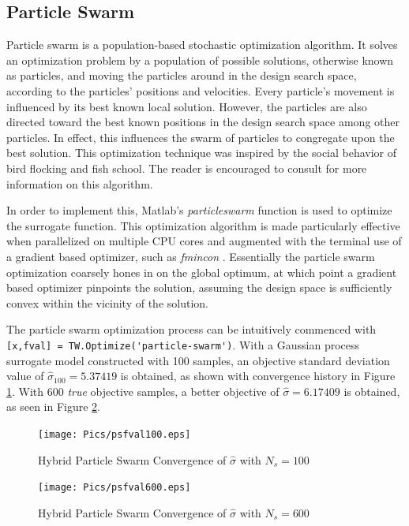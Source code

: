 \documentclass{article}
\begin{document}
\subsection{Particle Swarm} \label{ps}
Particle swarm is a population-based stochastic optimization algorithm. It solves an optimization problem by a population of possible solutions, otherwise known as particles, and moving the particles around in the design search space, according to the particles' positions and velocities. Every particle's movement is influenced by its best known local solution. However, the particles are also directed toward the best known positions in the design search space among other particles. In effect, this influences the swarm of particles to congregate upon the best solution. This optimization technique was inspired by the social behavior of bird flocking and fish school. The reader is encouraged to consult \cite{Kennedy1995} for more information on this algorithm. 

In order to implement this, Matlab's \textit{particleswarm} \cite{Matlab} function is used to optimize the surrogate function. This optimization algorithm is made particularly effective when parallelized on multiple CPU cores and augmented with the terminal use of a gradient based optimizer, such as \textit{fmincon} \cite{Matlab}. Essentially the particle swarm optimization coarsely hones in on the global optimum, at which point a gradient based optimizer pinpoints the solution, assuming the design space is sufficiently convex within the vicinity of the solution. 

The particle swarm optimization process can be intuitively commenced with \lstinline{[x,fval] = TW.Optimize('particle-swarm')}. With a Gaussian process surrogate model constructed with 100 samples, an objective standard deviation value of $\hat{\sigma}_{100} = 5.37419$ is obtained, as shown with convergence history in Figure \ref{fig:psconv100}. With 600 \textit{true} objective samples, a better objective of $\hat{\sigma}=6.17409$ is obtained, as seen in Figure \ref{fig:psconv600}.

\begin{figure}
    \centering
    \texttt{[image: Pics/psfval100.eps]}
    \caption{Hybrid Particle Swarm Convergence of $\hat{\sigma}$ with $N_s=100$}
    \label{fig:psconv100}
\end{figure}

\begin{figure}
    \centering
    \texttt{[image: Pics/psfval600.eps]}
    \caption{Hybrid Particle Swarm Convergence of $\hat{\sigma}$ with $N_s=600$}
    \label{fig:psconv600}
\end{figure}
\end{document}
